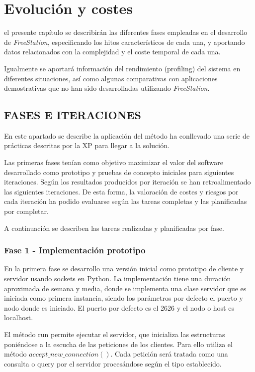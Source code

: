 \chapter{Evolución y costes}
\thispagestyle{fancy}

 el presente capítulo se describirán las diferentes fases empleadas
en el desarrollo de \emph{FreeStation}, especificando los hitos característicos
de cada una, y aportando datos relacionados con la complejidad y el coste temporal de
cada una.

Igualmente se aportará información del rendimiento (profiling) del sistema en
diferentes situaciones, así como algunas comparativas con aplicaciones
demostrativas que no han sido desarrolladas utilizando \emph{FreeStation}.

\section{\uppercase{Fases e iteraciones}}

En este apartado se describe la aplicación del método ha conllevado una serie de
prácticas descritas por la XP para llegar a la solución.

Las primeras fases tenían como objetivo maximizar el valor del software
desarrollado como prototipo y pruebas de concepto iniciales para siguientes
iteraciones. Según los resultados producidos por iteración se han
retroalimentado las siguientes iteraciones. De esta forma, la valoración de 
costes y riesgos por cada iteración ha podido evaluarse según las tareas
completas y las planificadas por completar.

A continuación se describen las tareas realizadas y planificadas por fase.

\subsection{Fase 1 - Implementación prototipo}

En la primera fase se desarrollo una versión inicial como prototipo de cliente y
servidor usando sockets en Python. La implementación tiene una duración
aproximada de semana y media, donde se implementa una clase servidor que es 
iniciada como primera instancia, siendo los
parámetros por defecto el puerto y nodo donde es iniciado. El puerto por defecto
es el 2626 y el nodo o host es localhost.

El método run permite ejecutar el servidor, que inicializa las estructuras
poniéndose a la escucha de las peticiones de los clientes. Para ello utiliza el
método $accept\_new\_connection()$. Cada petición será tratada como una consulta
o query por el servidor procesándose según el tipo establecido.

